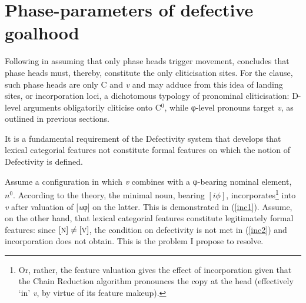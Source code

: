 \documentclass[output=paper]{langsci/langscibook}
\begin{document}
\section{Phase-parameters of defective goalhood}
\label{sec:phase}

Following \citet{Chomsky2008} in assuming that only phase heads
trigger movement,  \citet{Roberts2010} concludes that phase heads
must, thereby, constitute the only cliticisation sites. For the
clause, such phase heads are only C and \emph{v} and may adduce from
this idea of landing sites, or incorporation loci, a dichotomous typology of
pronominal cliticisation: D-level arguments obligatorily cliticise
onto C$^0$, while φ-level pronouns target \emph{v}, as outlined in
previous sections.

It is a fundamental requirement of the Defectivity system that
\citet{Roberts2010} develops that lexical categorial features not constitute
formal features on which the notion of Defectivity is defined.

Assume a configuration in which \emph{v} combines with a φ-bearing
nominal element, $n^0$. According to the theory, the minimal noun, bearing
$[i\phi]$, incorporates\footnote{Or, rather, the feature valuation gives the
    effect of incorporation given that the Chain Reduction algorithm pronounces
    the copy at the head (effectively `in' \emph{v}, by virtue of its
feature makeup).} into \emph{v} after valuation of [\emph{u}φ] on the
latter. This is demonstrated in (\ref{inc1}). Assume, on the other hand, that
lexical categorial features constitute legitimately formal features: since
$[\textsc{n}]\neq[\textsc{v}]$, the condition on defectivity is not met in
(\ref{inc2}) and incorporation does not obtain. This is the problem I propose
to resolve.
\end{document}
